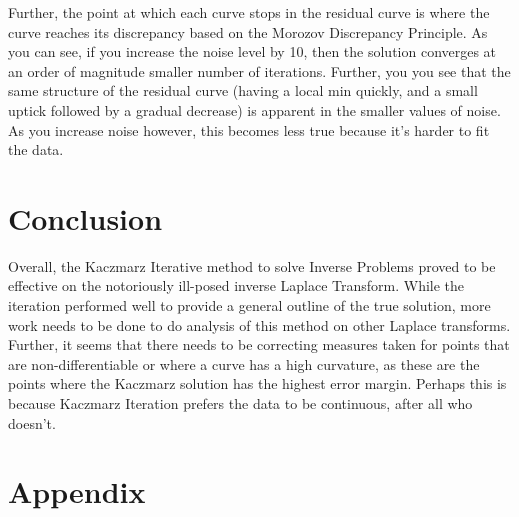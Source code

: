 \documentclass{article}
\begin{document}
Further, the point at which each curve stops in the residual curve is where the curve reaches its discrepancy based on the Morozov Discrepancy Principle. As you can see, if you increase the noise level by 10, then the solution converges at an order of magnitude smaller number of iterations. Further, you you see that the same structure of the residual curve (having a local min quickly, and a small uptick followed by a gradual decrease) is apparent in the smaller values of noise. As you increase noise however, this becomes less true because it's harder to fit the data.

\section{Conclusion}

Overall, the Kaczmarz Iterative method to solve Inverse Problems proved to be effective on the notoriously ill-posed inverse Laplace Transform. While the iteration performed well to provide a general outline of the true solution, more work needs to be done to do analysis of this method on other Laplace transforms. Further, it seems that there needs to be correcting measures taken for points that are non-differentiable or where a curve has a high curvature, as these are the points where the Kaczmarz solution has the highest error margin. Perhaps this is because Kaczmarz Iteration prefers the data to be continuous, after all who doesn't.

\section{Appendix}
\end{document}
